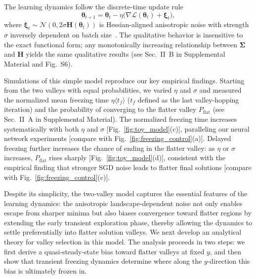 \documentclass[aps,prx,reprint,superscriptaddress,longbibliography,nofootinbib,floatfix]{revtex4-2}
\begin{document}
The learning dynamics follow the discrete-time update rule
\begin{equation}
    \bm{\theta}_{t+1} = \bm{\theta}_t - \eta \bigl( \nabla \mathcal{L}(\bm{\theta}_t) + \bm{\xi}_t \bigr),
\label{eq:SGD_updating_rule}
\end{equation}
where $\bm{\xi}_t \sim \mathcal{N}(0, 2\sigma \mathbf{H}(\bm{\theta}_t))$ is Hessian-aligned anisotropic noise with strength $\sigma$ inversely dependent on batch size~\cite{fengInverseVarianceFlatness2021,zhuAnisotropicNoiseStochastic2019,xieDiffusionTheoryDeep2021,liHessianBasedAnalysis2020,yangStochasticGradientDescent2023}. The qualitative behavior is insensitive to the exact functional form; any monotonically increasing relationship between $\mathbf{\Sigma}$ and $\mathbf{H}$ yields the same qualitative results (see Sec.~II~B in Supplemental Material and Fig.~S6).


Simulations of this simple model reproduce our key empirical findings. Starting from the two valleys with equal probabilities, we varied $\eta$ and $\sigma$ and measured the normalized mean freezing time $\eta \langle t_f \rangle$ ($t_f$ defined as the last valley-hopping iteration) and the probability of converging to the flatter valley $P_{\mathrm{flat}}$ (see Sec.~II~A in Supplemental Material). The normalized freezing time increases systematically with both $\eta$ and $\sigma$ [Fig.~\ref{fig:toy_model}(c)], paralleling our neural network experiments [compare with Fig.~\ref{fig:freezing_control}(a)]. Delayed freezing further increases the chance of ending in the flatter valley: as $\eta$ or $\sigma$ increases, $P_{\mathrm{flat}}$ rises sharply [Fig.~\ref{fig:toy_model}(d)], consistent with the empirical finding that stronger SGD noise leads to flatter final solutions [compare with Fig.~\ref{fig:freezing_control}(c)].

Despite its simplicity, the two-valley model captures the essential features of the learning dynamics: the anisotropic landscape-dependent noise not only enables escape from sharper minima but also biases convergence toward flatter regions by extending the early transient exploration phase, thereby allowing the dynamics to settle preferentially into flatter solution valleys. We next develop an analytical theory for valley selection in this model. The analysis proceeds in two steps: we first derive a quasi-steady-state bias toward flatter valleys at fixed $y$, and then show that transient freezing dynamics determine where along the $y$-direction this bias is ultimately frozen in.
\end{document}
